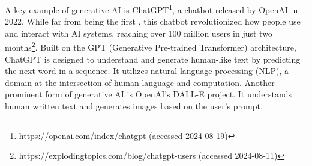 A key example of generative AI is ChatGPT\footnote{https://openai.com/index/chatgpt (accessed 2024-08-19)}, a chatbot released by OpenAI in 2022. While far from being the first \citep{weizenbaumELIZA1996}, this chatbot revolutionized how people use and interact with AI systems, reaching over 100 million users in just two months\footnote{https://explodingtopics.com/blog/chatgpt-users (accessed 2024-08-11)}. Built on the GPT (Generative Pre-trained Transformer) architecture, ChatGPT is designed to understand and generate human-like text by predicting the next word in a sequence. It utilizes natural language processing (NLP), a domain at the intersection of human language and computation. Another prominent form of generative AI is OpenAI's DALL-E project. It understands human written text and generates images based on the user's prompt.








